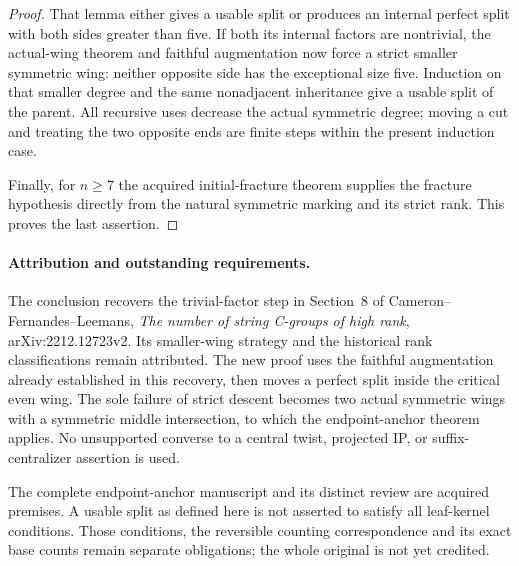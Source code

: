 \documentclass[11pt,a4paper]{article}
\begin{document}
\begin{proof}
That lemma either gives a usable split or produces an internal perfect
split with both sides greater than five. If both its internal factors
are nontrivial, the actual-wing theorem and faithful augmentation now
force a strict smaller symmetric wing: neither opposite side has the
exceptional size five. Induction on that smaller degree and the same
nonadjacent inheritance give a usable split of the parent. All recursive
uses decrease the actual symmetric degree; moving a cut and treating the
two opposite ends are finite steps within the present induction case.

Finally, for $n\ge7$ the acquired initial-fracture theorem supplies
the fracture hypothesis directly from the natural symmetric marking
and its strict rank. This proves the last assertion.
\end{proof}

\paragraph{Attribution and outstanding requirements.}
The conclusion recovers the trivial-factor step in Section~8 of
Cameron--Fernandes--Leemans, \emph{The number of string C-groups
of high rank}, arXiv:2212.12723v2. Its smaller-wing strategy and
the historical rank classifications remain attributed. The new proof
uses the faithful augmentation already established in this recovery,
then moves a perfect split inside the critical even wing. The sole
failure of strict descent becomes two actual symmetric wings with a
symmetric middle intersection, to which the endpoint-anchor theorem
applies. No unsupported converse to a central twist, projected IP,
or suffix-centralizer assertion is used.

The complete endpoint-anchor manuscript and its distinct review are
acquired premises. A usable split as defined here is not
asserted to satisfy all leaf-kernel conditions. Those conditions, the
reversible counting correspondence and its exact base counts remain
separate obligations; the whole original is not yet credited.
\end{document}
